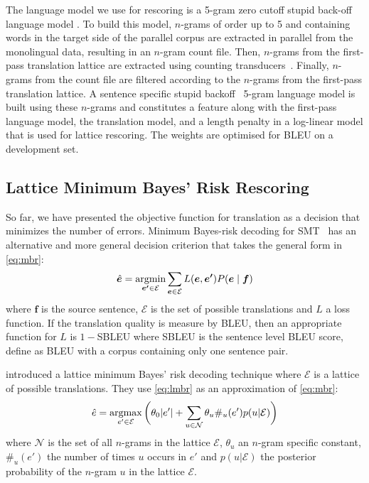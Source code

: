 The language model we use for rescoring is a 5-gram zero cutoff stupid back-off language model \cite{brants-popat-xu-och-dean:2007:EMNLP-CoNLL}.
To build this model, $n$-grams of order up to 5 and containing words in the target side of the parallel corpus 
are extracted in parallel from the monolingual data, resulting in an $n$-gram count file.
Then, $n$-grams from the first-pass translation lattice 
are extracted using counting transducers~\citep{allauzen:03}.
Finally, $n$-grams from the count file are filtered according to the $n$-grams from the first-pass 
translation lattice. A sentence specific stupid backoff~\citep{brants-popat-xu-och-dean:2007:EMNLP-CoNLL}
5-gram language model is built using these $n$-grams and constitutes a feature along with the first-pass
language model, the translation model, and a length penalty in a log-linear model that is used
for lattice rescoring. The weights are optimised for BLEU on a development set.

\subsection{Lattice Minimum Bayes' Risk Rescoring} \label{sec:lmbr}

So far, we have presented the objective function for translation as
a decision that minimizes the number of errors. %
Minimum Bayes-risk decoding for SMT~\citep{kumar-byrne:2004:NAACL}
has an alternative and more general decision criterion that takes the
general form in \autoref{eq:mbr}:
%
\begin{equation} \label{eq:mbr}
  \hat{\bm{e}} = \operatorname*{argmin}_{\bm{e'} \in \mathcal{E}} \sum_{\bm{e} \in \mathcal{E}} L(\bm{e},\bm{e'}) P(\bm{e} \mid \bm{f})
\end{equation}
%
where $\bm{f}$ is the source sentence, $\mathcal{E}$ is the set of possible
translations and  $L$ a loss function. If the translation quality is measure by
BLEU, then an appropriate function for $L$ is $1 - $SBLEU where SBLEU is the
sentence level BLEU score, define as BLEU with a corpus containing
only one sentence pair. %

\citet{tromble-kumar-och-macherey:2008:EMNLP} introduced a
lattice minimum Bayes' risk decoding technique where $\mathcal{E}$ is a lattice
of possible translations. They use \autoref{eq:lmbr} as an approximation
of \autoref{eq:mbr}:
%
\begin{equation} \label{eq:lmbr}
  \hat{e} = \operatorname*{argmax}_{e' \in \mathcal{E}} \bigg ( \theta_0 |e'| + \sum_{u \in \mathcal{N}} \theta_u \#_u(e') p(u|\mathcal{E}) \bigg )
\end{equation}
%
where $\mathcal{N}$ is the set of all $n$-grams in the lattice $\mathcal{E}$, $\theta_u$
an $n$-gram specific constant, $\#_u(e')$ the number of times $u$ occurs in
$e'$ and $p(u|\mathcal{E})$
the posterior probability of the $n$-gram $u$ in the lattice $\mathcal{E}$.

